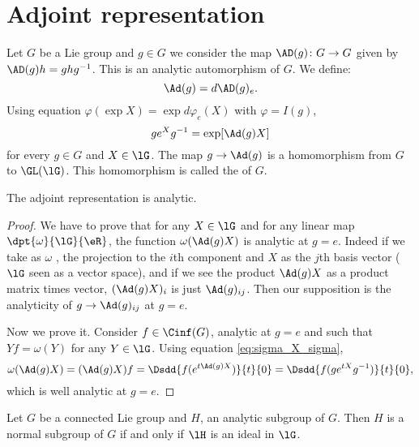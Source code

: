 \section{Adjoint representation}

Let $G$ be a Lie group and $g\in G$ we consider the map $\AD(g)\colon G\to G$ given by $\AD(g)h=g hg^{-1}$. This is an analytic automorphism of $G$. We define:
\[
    \Ad(g)=d\AD(g)_e.
\]
Using equation $\varphi(\exp X)=\exp d\varphi_e(X)$ with $\varphi=I(g)$,
\begin{equation}\label{eq:sigma_X_sigma}
  g e^{X}g^{-1}=\exp[ \Ad(g)X ]
\end{equation}
for every $g\in G$ and $X\in\lG$. The map $g\to\Ad(g)$ is a homomorphism from $G$ to $\GL(\lG)$. This homomorphism is called the  of $G$.

\begin{proposition}
The adjoint representation is analytic.
\end{proposition}

\begin{proof}
We have to prove that for any $X\in\lG$ and for any linear map $\dpt{\omega}{\lG}{\eR}$, the function $\omega(\Ad(g)X)$ is analytic at $g=e$. Indeed if we take as $\omega$ , the projection to the $i$th component and $X$ as the $j$th basis vector ($\lG$ seen as a vector space), and if we see the product $\Ad(g)X$ as a product matrix times vector, $(\Ad(g)X)_i$ is just $\Ad(g)_{ij}$. Then our supposition is the analyticity of $g\to\Ad(g)_{ij}$ at $g=e$. 

Now we prove it. Consider $f\in\Cinf(G)$, analytic at $g=e$ and such that $Yf=\omega(Y)$ for any $Y\in\lG$. Using equation \eqref{eq:sigma_X_sigma},
\begin{equation}
  \omega(\Ad(g)X)=(\Ad(g)X)f
                      =\Dsdd{ f(e^{t\Ad(g)X}) }{t}{0}
                      =\Dsdd{ f(g e^{tX}g^{-1}) }{t}{0},
\end{equation}
which is well analytic at $g=e$.
\end{proof}


\begin{proposition}
Let $G$ be a connected Lie group and $H$, an analytic subgroup of $G$. Then $H$ is a normal subgroup of $G$ if and only if $\lH$ is an ideal in $\lG$.
\end{proposition}

